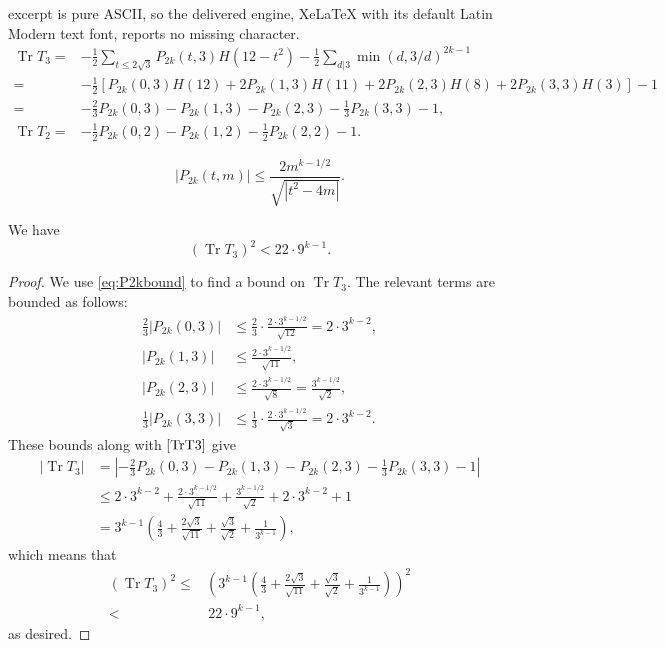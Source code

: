 \documentclass[10pt,a4paper]{amsart}
\DeclareMathOperator{\Tr}{Tr}
\newcommand{\lrb}[1]{\left[#1\right]}
\begin{document}
excerpt is pure ASCII, so the delivered engine, XeLaTeX with its default Latin Modern text font, reports no missing character.
\begin{align}
    \Tr T_3 =& -\frac{1}{2}\sum_{t\leq2\sqrt{3}}P_{2k}(t,3)H(12-t^2)-\frac{1}{2}\sum_{d|3}\min(d,3/d)^{2k-1}\\
    =&-\frac{1}{2}\lrb{P_{2k}(0,3)H(12)+2P_{2k}(1,3)H(11)+2P_{2k}(2,3)H(8)+2P_{2k}(3,3)H(3)}-1\\
    =&-\frac{2}{3}P_{2k}(0,3)-P_{2k}(1,3)-P_{2k}(2,3)-\frac{1}{3}P_{2k}(3,3)-1,\label{TrT3}  \\
    \Tr T_2 =& -\frac{1}{2}P_{2k}(0,2)-P_{2k}(1,2)-\frac{1}{2}P_{2k}(2,2)-1.\label{eq:T2trace}
\end{align}

    \begin{equation}
        |P_{2k}(t, m)| \leq \frac{2m^{k - 1/2}}{\sqrt{|t^2 - 4m|}}\label{eq:P2kbound}.
    \end{equation}

\begin{lemma}\label{lemma:T3bound}
    We have
    \begin{equation}
        (\Tr T_3)^2 < 22 \cdot 9^{k-1}.
    \end{equation}
\end{lemma}

\begin{proof}
    We use \eqref{eq:P2kbound} to find a bound on $\Tr T_3$. 
The relevant terms are bounded as follows:
\begin{align}
    \frac{2}{3}\left|P_{2k}(0,3)\right|&\leq \frac{2}{3}\cdot\frac{2 \cdot 3^{k-1/2}}{\sqrt{12}}=2\cdot3^{k-2},\\
    \left|P_{2k}(1,3)\right|&\leq \frac{2\cdot3^{k-1/2}}{\sqrt{11}},\\
    \left|P_{2k}(2,3)\right|&\leq\frac{2\cdot3^{k-1/2}}{\sqrt{8}}=\frac{3^{k-1/2}}{\sqrt{2}},\\
    \frac{1}{3}\left|P_{2k}(3,3)\right|&\leq \frac{1}{3}\cdot\frac{2\cdot3^{k-1/2}}{\sqrt{3}}=2 \cdot 3^{k-2}.
\end{align}
These bounds along with $\eqref{TrT3}$ give
\begin{align}
    |\Tr T_3|&=\left|-\frac{2}{3}P_{2k}(0,3)-P_{2k}(1,3)-P_{2k}(2,3)-\frac{1}{3}P_{2k}(3,3)-1\right|\\
    &\leq2\cdot3^{k-2}+\frac{2\cdot3^{k-1/2}}{\sqrt{11}}+\frac{3^{k-1/2}}{\sqrt{2}}+2\cdot3^{k-2}+1\\
    &=3^{k-1}\left(\frac{4}{3}+\frac{2\sqrt{3}}{\sqrt{11}}+\frac{\sqrt{3}}{\sqrt{2}}+\frac{1}{3^{k-1}}\right),
\end{align}
which means that
\begin{align}
    (\Tr T_3)^2\leq&\left(3^{k-1}\left(\frac{4}{3}+\frac{2\sqrt{3}}{\sqrt{11}}+\frac{\sqrt{3}}{\sqrt{2}}+\frac{1}{3^{k-1}}\right)\right)^2\\
    <& \,22 \cdot 9^{k-1},
\end{align}
as desired.
\end{proof}
\end{document}
